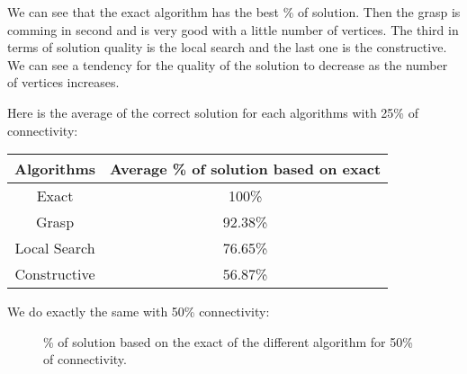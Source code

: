 We can see that the exact algorithm has the best \% of solution. Then the grasp is comming in second and is very good with a little number of vertices. The third in terms of solution quality is the local search and the last one is the constructive. We can see a tendency for the quality of the solution to decrease as the number of vertices increases. \bigskip

Here is the average of the correct solution for each algorithms with 25\% of connectivity: \bigskip

\begin{center}
    \begin{tabular}{|c|c|}
        \hline
        \textbf{Algorithms} & \textbf{Average \% of solution based on exact}                         \\
        \hline
        Exact & 100\% \\
        Grasp & 92.38\% \\
        Local Search & 76.65\% \\
        Constructive & 56.87\% \\
        \hline
    \end{tabular}
\end{center}

We do exactly the same with 50\% connectivity:

\begin{figure}[H]
    \centering
    \caption{\% of solution based on the exact of the different algorithm for 50\% of connectivity.}
    \label{fig:algorithm_50_accuracy}
\end{figure}

